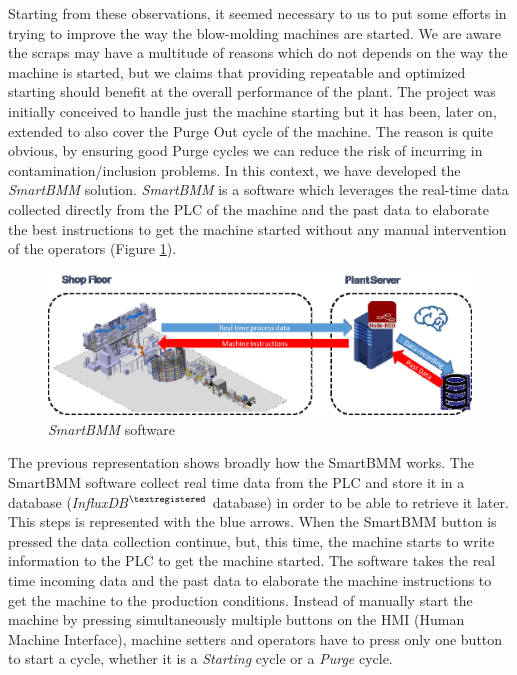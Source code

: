 Starting from these observations, it seemed necessary to us to put some efforts in trying to improve the way the blow-molding machines are started. We are aware the scraps may have a multitude of reasons which do not depends on the way the machine is started, but we claims that providing repeatable and optimized starting should benefit at the overall performance of the plant. 
The project was initially conceived to handle just the machine starting but it has been, later on, extended to also cover the Purge Out cycle of the machine. The reason is quite obvious, by ensuring good Purge cycles we can reduce the risk of incurring in contamination/inclusion problems. In this context, we have developed the \textit{SmartBMM} solution. \textit{SmartBMM} is a software which leverages the real-time data collected directly from the PLC of the machine and the past data to elaborate the best instructions to get the machine started without any manual intervention of the operators (Figure \ref{fig:SmartBMM}).

\begin{figure}
\centerline{\includegraphics[scale=1]{images/chapter_3/SmartBMM.eps}}
\caption{\textit{SmartBMM} software}
\label{fig:SmartBMM}
\end{figure}

The previous representation shows broadly how the SmartBMM works. The SmartBMM software collect real time data from the PLC and store it in a database (\textit{InfluxDB}$^{\tiny{\textregistered}}$ database) in order to be able to retrieve it later. This steps is represented with the blue arrows. When the SmartBMM button is pressed the data collection continue, but, this time, the machine starts to write information to the PLC to get the machine started. The software takes the real time incoming data and the past data to elaborate the machine instructions to get the machine to the production conditions. Instead of manually start the machine by pressing simultaneously multiple buttons on the HMI (Human Machine Interface), machine setters and operators have to press only one button to start a cycle, whether it is a \textit{Starting} cycle or a \textit{Purge} cycle.  


